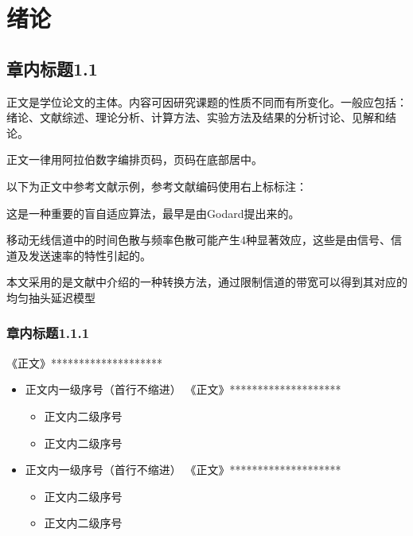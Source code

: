 \chapter{绪论}\label{Chap:chap1}


\section{章内标题1.1}\label{Sec1.1}

正文是学位论文的主体。内容可因研究课题的性质不同而有所变化。一般应包括：绪论、文献综述、理论分析、计算方法、实验方法及结果的分析讨论、见解和结论。

正文一律用阿拉伯数字编排页码，页码在底部居中。

以下为正文中参考文献示例，参考文献编码使用右上标标注：

这是一种重要的盲自适应算法，最早是由Godard提出来的\cite{Sanguinetti2020MIMO2}。

移动无线信道中的时间色散与频率色散可能产生4种显著效应\cite{Larsson2014mMIMO}，这些是由信号、信道及发送速率的特性引起的。

本文采用的是文献中介绍的一种转换方法，通过限制信道的带宽可以得到其对应的均匀抽头延迟模型\cite{MarzettaTWC2010,Rusek2013SUMIMO,lijiandong,Venkatesan2007NW}


\subsection{章内标题1.1.1}\label{Sec1.1.1}

《正文》********************
\begin{itemize}
	\item [(1)]   正文内一级序号（首行不缩进）
	《正文》********************
		\begin{itemize}
			\item [(a)] 正文内二级序号
			\item [(b)] 正文内二级序号
		\end{itemize}
	
	\item [(2)]   正文内一级序号（首行不缩进）
	《正文》********************
	\begin{itemize}
		\item [(a)] 正文内二级序号
		\item [(b)] 正文内二级序号
	\end{itemize}

\end{itemize}











